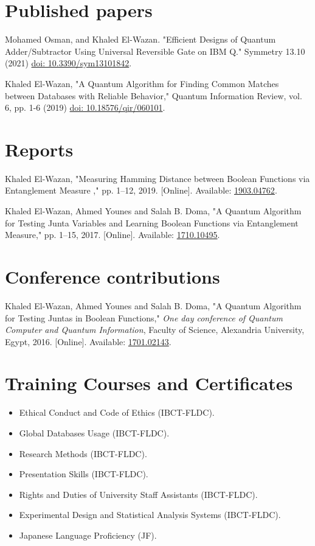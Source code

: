 \documentclass[margin,line]{resume}
\newcommand*{\doi}[1]{\href{http://dx.doi.org/#1}{doi: #1}}
\begin{document}
\begin{resume}
	\section{ \mysidestyle Published papers}

	Mohamed Osman, and Khaled El-Wazan. "Efficient Designs of Quantum Adder/Subtractor Using Universal Reversible Gate on IBM Q." Symmetry 13.10 (2021) \doi{10.3390/sym13101842}.


	Khaled El-Wazan, "A Quantum Algorithm for Finding Common Matches between Databases with Reliable Behavior," Quantum Information Review, vol. 6, pp. 1-6 (2019) \doi{10.18576/qir/060101}.


	\section{\mysidestyle Reports}

	Khaled El-Wazan, "Measuring Hamming Distance between Boolean Functions via Entanglement Measure ,"  pp. 1--12, 2019.
		[Online]. Available: \href{http://arxiv.org/abs/1903.04762}{1903.04762}.



	Khaled El-Wazan, Ahmed Younes and Salah B. Doma, "A Quantum Algorithm for Testing Junta Variables and Learning Boolean Functions via Entanglement Measure,"  pp. 1--15, 2017.
		[Online]. Available: \href{http://arxiv.org/abs/1710.10495}{1710.10495}.



	\section{ \mysidestyle Conference contributions}


	Khaled El-Wazan, Ahmed Younes and Salah B. Doma, "A Quantum Algorithm for Testing Juntas in Boolean Functions," \textit{One day conference of Quantum Computer and Quantum Information}, Faculty of Science, Alexandria University, Egypt, 2016. [Online]. Available: \href{http://arxiv.org/abs/1701.02143}{1701.02143}.


	\section{\mysidestyle Training Courses and Certificates}
	\begin{itemize}

		\item Ethical Conduct and Code of Ethics (IBCT-FLDC).
		\item Global Databases Usage (IBCT-FLDC).
		\item Research Methods (IBCT-FLDC).
		\item Presentation Skills (IBCT-FLDC).
		\item Rights and Duties of University Staff Assistants (IBCT-FLDC).
		\item Experimental Design and Statistical Analysis Systems (IBCT-FLDC).
		\item Japanese Language Proficiency (JF).


\end{itemize}
\end{resume}
\end{document}
